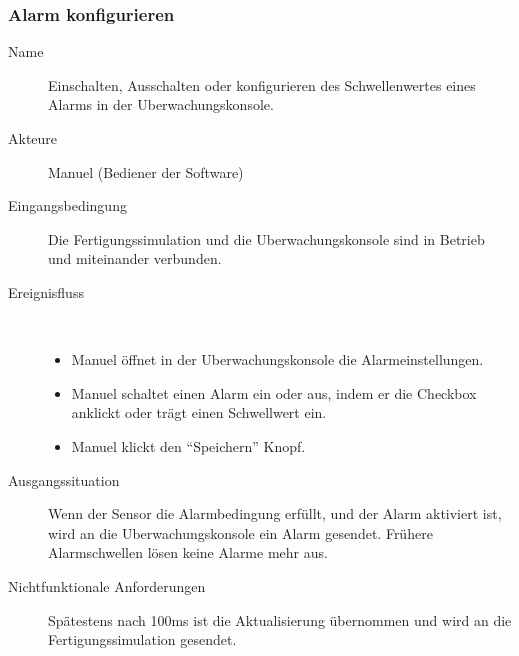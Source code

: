 \documentclass[parskip=full]{scrartcl}
\begin{document}
\subsubsection{Alarm konfigurieren}
\begin{description}
  \item[Name] Einschalten, Ausschalten oder konfigurieren des Schwellenwertes eines Alarms in der \gls{Uberwachungskonsole}.
  \item[Akteure] Manuel (Bediener der Software)
  \item[Eingangsbedingung] Die \gls{Fertigungssimulation} und die \gls{Uberwachungskonsole} sind in Betrieb und miteinander verbunden.
  \item[Ereignisfluss]~\\
  \begin{itemize}[noitemsep]
    \item Manuel \"offnet in der \gls{Uberwachungskonsole} die Alarmeinstellungen.
    \item Manuel schaltet einen Alarm ein oder aus, indem er die Checkbox anklickt oder trägt einen Schwellwert ein.
    \item Manuel klickt den "`Speichern"' Knopf.
  \end{itemize}
  \item[Ausgangssituation] Wenn der Sensor die Alarmbedingung erf\"ullt, und der Alarm aktiviert ist, wird an die \gls{Uberwachungskonsole} ein Alarm gesendet.
  Frühere Alarmschwellen lösen keine Alarme mehr aus.
  \item [Nichtfunktionale Anforderungen] Sp\"atestens nach 100ms ist die Aktualisierung \"ubernommen und wird
    an die \gls{Fertigungssimulation} gesendet.
\end{description}
\end{document}
